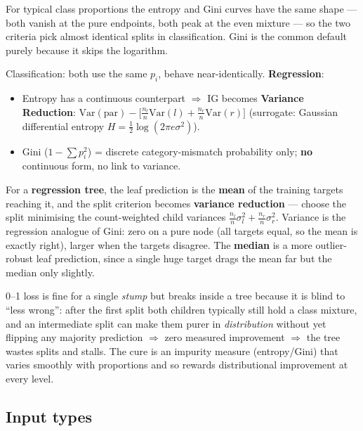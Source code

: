 \documentclass[11pt, a4paper]{article}
\newcommand{\kw}[1]{\textbf{#1}}
\begin{document}
For typical class proportions the entropy and Gini curves have the same shape — both vanish at the
pure endpoints, both peak at the even mixture — so the two criteria pick almost identical splits in
classification. Gini is the common default purely because it skips the logarithm.

\begin{trapbox}
Classification: both use the same $p_i$, behave near-identically. \kw{Regression}:
\begin{itemize}
  \item Entropy has a continuous counterpart $\Rightarrow$ IG becomes \kw{Variance Reduction}:
  $\text{Var}(\text{par})-\big[\tfrac{n_l}{n}\text{Var}(l)+\tfrac{n_r}{n}\text{Var}(r)\big]$
  (surrogate: Gaussian differential entropy $H=\tfrac12\log(2\pi e\sigma^2)$).
  \item Gini ($1-\sum p_i^2$) = discrete category-mismatch probability only; \kw{no} continuous form,
  no link to variance.
\end{itemize}
\end{trapbox}

For a \kw{regression tree}, the leaf prediction is the \kw{mean} of the training targets reaching
it, and the split criterion becomes \kw{variance reduction} — choose the split minimising the
count-weighted child variances $\tfrac{n_l}{n}\sigma_l^2+\tfrac{n_r}{n}\sigma_r^2$. Variance is the
regression analogue of Gini: zero on a pure node (all targets equal, so the mean is exactly right),
larger when the targets disagree. The \kw{median} is a more outlier-robust leaf prediction, since a
single huge target drags the mean far but the median only slightly.

\begin{pitfallbox}
0--1 loss is fine for a single \emph{stump} but breaks inside a tree because it is blind to ``less
wrong'': after the first split both children typically still hold a class mixture, and an
intermediate split can make them purer in \emph{distribution} without yet flipping any majority
prediction $\Rightarrow$ zero measured improvement $\Rightarrow$ the tree wastes splits and stalls.
The cure is an impurity measure (entropy/Gini) that varies smoothly with proportions and so rewards
distributional improvement at every level.
\end{pitfallbox}

\subsection{Input types}
\end{document}
